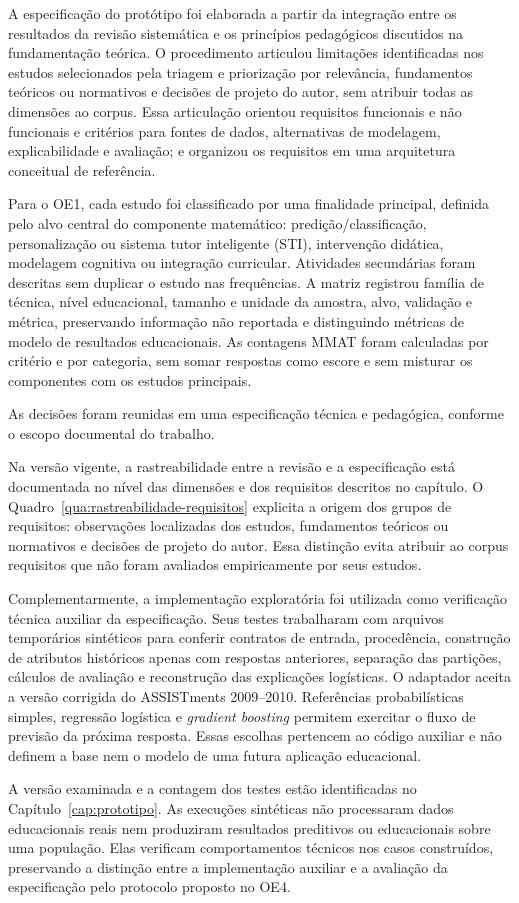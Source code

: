A especificação do protótipo foi elaborada a partir da integração entre os
resultados da revisão sistemática e os princípios pedagógicos discutidos na
fundamentação teórica. O procedimento articulou limitações identificadas nos estudos selecionados pela triagem e priorização por relevância, fundamentos teóricos ou normativos
e decisões de projeto do autor, sem atribuir todas as dimensões ao corpus.
Essa articulação orientou requisitos funcionais e não funcionais e critérios para
fontes de dados, alternativas de modelagem, explicabilidade e avaliação; e
organizou os requisitos em uma arquitetura conceitual de referência.

Para o OE1, cada estudo foi classificado por uma finalidade principal, definida pelo alvo central do componente matemático: predição/classificação, personalização ou sistema tutor inteligente (STI), intervenção didática, modelagem cognitiva ou integração curricular. Atividades secundárias foram descritas sem duplicar o estudo nas frequências. A matriz registrou família de técnica, nível educacional, tamanho e unidade da amostra, alvo, validação e métrica, preservando informação não reportada e distinguindo métricas de modelo de resultados educacionais. As contagens MMAT foram calculadas por critério e por categoria, sem somar respostas como escore e sem misturar os componentes com os estudos principais.

As decisões foram reunidas em uma especificação técnica e pedagógica, conforme o escopo documental do trabalho.

Na versão vigente, a rastreabilidade entre a revisão e a especificação está documentada no nível das dimensões e dos requisitos descritos no capítulo. O Quadro~\ref{qua:rastreabilidade-requisitos} explicita a origem dos grupos de requisitos: observações localizadas dos estudos, fundamentos teóricos ou normativos e decisões de projeto do autor. Essa distinção evita atribuir ao corpus requisitos que não foram avaliados empiricamente por seus estudos.

Complementarmente, a implementação exploratória foi utilizada como verificação técnica auxiliar da especificação. Seus testes trabalharam com arquivos temporários sintéticos para conferir contratos de entrada, procedência, construção de atributos históricos apenas com respostas anteriores, separação das partições, cálculos de avaliação e reconstrução das explicações logísticas. O adaptador aceita a versão corrigida do ASSISTments 2009--2010. Referências probabilísticas simples, regressão logística e \textit{gradient boosting} permitem exercitar o fluxo de previsão da próxima resposta. Essas escolhas pertencem ao código auxiliar e não definem a base nem o modelo de uma futura aplicação educacional.

A versão examinada e a contagem dos testes estão identificadas no Capítulo~\ref{cap:prototipo}. As execuções sintéticas não processaram dados educacionais reais nem produziram resultados preditivos ou educacionais sobre uma população. Elas verificam comportamentos técnicos nos casos construídos, preservando a distinção entre a implementação auxiliar e a avaliação da especificação pelo protocolo proposto no OE4.




